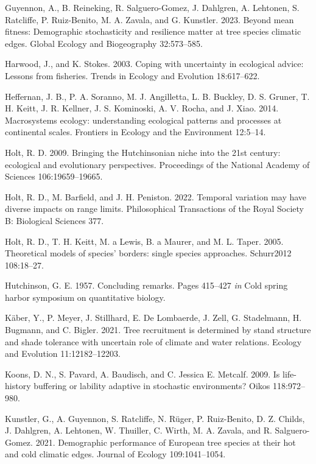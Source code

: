 \documentclass[12pt]{article}
\newlength{\cslhangindent}
\newenvironment{cslreferences}%
  {\setlength{\parindent}{0pt}%
  \everypar{\setlength{\hangindent}{\cslhangindent}}\ignorespaces}%
  {\par}
\begin{document}
\begin{cslreferences}
\leavevmode\hypertarget{ref-Guyennon2023}{}%
Guyennon, A., B. Reineking, R. Salguero-Gomez, J. Dahlgren, A. Lehtonen,
S. Ratcliffe, P. Ruiz-Benito, M. A. Zavala, and G. Kunstler. 2023.
Beyond mean fitness: Demographic stochasticity and resilience matter at
tree species climatic edges. Global Ecology and Biogeography
32:573--585.

\leavevmode\hypertarget{ref-Harwood2003}{}%
Harwood, J., and K. Stokes. 2003. Coping with uncertainty in ecological
advice: Lessons from fisheries. Trends in Ecology and Evolution
18:617--622.

\leavevmode\hypertarget{ref-Heffernan2014}{}%
Heffernan, J. B., P. A. Soranno, M. J. Angilletta, L. B. Buckley, D. S.
Gruner, T. H. Keitt, J. R. Kellner, J. S. Kominoski, A. V. Rocha, and J.
Xiao. 2014. Macrosystems ecology: understanding ecological patterns and
processes at continental scales. Frontiers in Ecology and the
Environment 12:5--14.

\leavevmode\hypertarget{ref-holt2009}{}%
Holt, R. D. 2009. Bringing the Hutchinsonian niche into the 21st
century: ecological and evolutionary perspectives. Proceedings of the
National Academy of Sciences 106:19659--19665.

\leavevmode\hypertarget{ref-Holt2022}{}%
Holt, R. D., M. Barfield, and J. H. Peniston. 2022. Temporal variation
may have diverse impacts on range limits. Philosophical Transactions of
the Royal Society B: Biological Sciences 377.

\leavevmode\hypertarget{ref-Holt2005}{}%
Holt, R. D., T. H. Keitt, M. a Lewis, B. a Maurer, and M. L. Taper.
2005. Theoretical models of species' borders: single species approaches.
Schurr2012 108:18--27.

\leavevmode\hypertarget{ref-Hutchinson1957}{}%
Hutchinson, G. E. 1957. Concluding remarks. Pages 415--427 \emph{in}
Cold spring harbor symposium on quantitative biology.

\leavevmode\hypertarget{ref-Kaber2021}{}%
Käber, Y., P. Meyer, J. Stillhard, E. De Lombaerde, J. Zell, G.
Stadelmann, H. Bugmann, and C. Bigler. 2021. Tree recruitment is
determined by stand structure and shade tolerance with uncertain role of
climate and water relations. Ecology and Evolution 11:12182--12203.

\leavevmode\hypertarget{ref-Koons2009}{}%
Koons, D. N., S. Pavard, A. Baudisch, and C. Jessica E. Metcalf. 2009.
Is life-history buffering or lability adaptive in stochastic
environments? Oikos 118:972--980.

\leavevmode\hypertarget{ref-Kunstler2021}{}%
Kunstler, G., A. Guyennon, S. Ratcliffe, N. Rüger, P. Ruiz-Benito, D. Z.
Childs, J. Dahlgren, A. Lehtonen, W. Thuiller, C. Wirth, M. A. Zavala,
and R. Salguero-Gomez. 2021. Demographic performance of European tree
species at their hot and cold climatic edges. Journal of Ecology
109:1041--1054.


\end{cslreferences}
\end{document}
